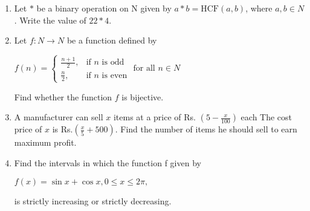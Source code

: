 \documentclass{article}
\begin{document}
\begin{enumerate}
\item 
Let $*$ be a binary operation on N given by $a * b = \text{HCF}(a, b)$, where $a, b \in N$. Write the value of $22 * 4$.

\item 
Let $f : N \rightarrow N $ be a function defined by
\begin{center}
$
f(n) = 
\begin{cases} 
\frac{n+1}{2}, & \text{if }  n \text{ is odd} \\
\frac{n}{2}, & \text{if } n \text{ is even}
\end{cases}
\text{ for all } n \in N $
\end{center}
Find whether the function $f$ is bijective.

\item 
A manufacturer can sell $x$ items at a price of Rs. $\left(5 - \frac{x}{100}\right)$ each The cost price of $x$ is Rs.$\left(\frac{x}{5} + 500\right)$. Find the number of items he should sell to earn maximum profit.

\item 
Find the intervals in which the function f given by
\begin{center}
$f(x) = \sin x + \cos x, 0 \leq x \leq 2\pi,$   
\end{center}
is strictly increasing or strictly decreasing.

\end{enumerate}
\end{document}
